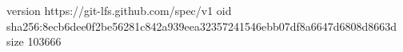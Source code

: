 version https://git-lfs.github.com/spec/v1
oid sha256:8ecb6dee0f2be56281c842a939eea32357241546ebb07df8a6647d6808d8663d
size 103666
